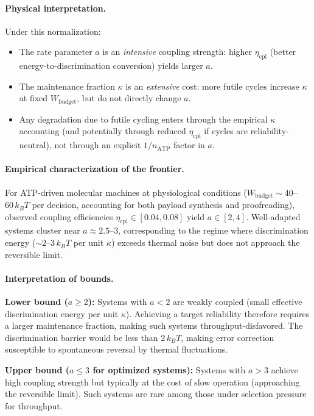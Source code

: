 \documentclass[11pt,twocolumn]{article}
\begin{document}
\paragraph{Physical interpretation.} Under this normalization:
\begin{itemize}[leftmargin=*,itemsep=2pt]
    \item The rate parameter $a$ is an \emph{intensive} coupling strength: higher $\eta_{\mathrm{cpl}}$ (better energy-to-discrimination conversion) yields larger $a$.
    \item The maintenance fraction $\kappa$ is an \emph{extensive} cost: more futile cycles increase $\kappa$ at fixed $W_{\mathrm{budget}}$, but do not directly change $a$.
    \item Any degradation due to futile cycling enters through the empirical $\kappa$ accounting (and potentially through reduced $\eta_{\mathrm{cpl}}$ if cycles are reliability-neutral), not through an explicit $1/n_{\mathrm{ATP}}$ factor in $a$.
\end{itemize}

\paragraph{Empirical characterization of the frontier.} For ATP-driven molecular machines at physiological conditions ($W_{\mathrm{budget}} \sim 40$--$60\, k_B T$ per decision, accounting for both payload synthesis and proofreading), observed coupling efficiencies $\eta_{\mathrm{cpl}} \in [0.04, 0.08]$ yield $a \in [2, 4]$. Well-adapted systems cluster near $a \approx 2.5$--$3$, corresponding to the regime where discrimination energy ($\sim 2$--$3\, k_B T$ per unit $\kappa$) exceeds thermal noise but does not approach the reversible limit.

\paragraph{Interpretation of bounds.}

\textbf{Lower bound ($a \geq 2$):} Systems with $a < 2$ are weakly coupled (small effective discrimination energy per unit $\kappa$). Achieving a target reliability therefore requires a larger maintenance fraction, making such systems throughput-disfavored. The discrimination barrier would be less than $2\, k_B T$, making error correction susceptible to spontaneous reversal by thermal fluctuations.

\textbf{Upper bound ($a \leq 3$ for optimized systems):} Systems with $a > 3$ achieve high coupling strength but typically at the cost of slow operation (approaching the reversible limit). Such systems are rare among those under selection pressure for throughput.
\end{document}
